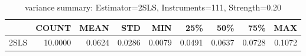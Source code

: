 \begin{table}[ht]
\centering
\caption{variance summary: Estimator=2SLS, Instruments=111, Strength=0.20}
\begin{tabular}{lrrrrrrrr}
\toprule
 & COUNT & MEAN & STD & MIN & 25\% & 50\% & 75\% & MAX \\
\midrule
2SLS & 10.0000 & 0.0624 & 0.0286 & 0.0079 & 0.0491 & 0.0637 & 0.0728 & 0.1072 \\
\bottomrule
\end{tabular}
\end{table}
